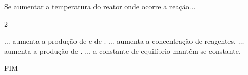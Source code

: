 \documentclass[addpoints, answers]{exam}
\begin{document}
\begin{questions}
		\vspace{5pt}
		\question[8] Se aumentar a temperatura do reator onde ocorre a reação...
		
		\begin{multicols}{2}
			\begin{choices}
				\choice $\ldots$ aumenta a produção de  e de .
				\choice $\ldots$ aumenta a concentração de reagentes.
				\correctchoice $\ldots$ aumenta a produção de .
				\choice $\ldots$ a constante de equilíbrio mantém-se constante.
			\end{choices}
		\end{multicols}
		
	\end{questions}
	
	\vspace{10pt}
	\center
	FIM
	
	\vfill
	\center
	\pointtable[h]
\end{document}
